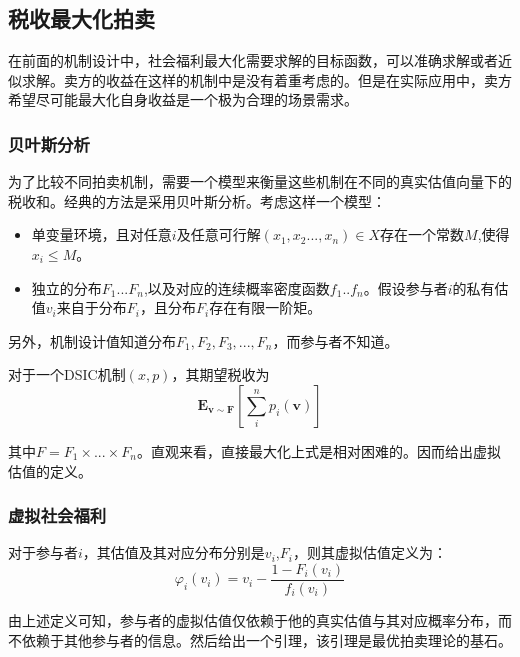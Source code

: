 \documentclass[promaster]{thesis-uestc}
\begin{document}
\subsection{税收最大化拍卖}
在前面的机制设计中，社会福利最大化需要求解的目标函数，可以准确求解或者近似求解。卖方的收益在这样的机制中是没有着重考虑的。但是在实际应用中，卖方希望尽可能最大化自身收益是一个极为合理的场景需求。

\subsubsection{贝叶斯分析}
为了比较不同拍卖机制，需要一个模型来衡量这些机制在不同的真实估值向量下的税收和。经典的方法是采用贝叶斯分析。考虑这样一个模型：

\begin{itemize}
    \item 单变量环境，且对任意$i$及任意可行解$(x_1,x_2...,x_n)\in X$存在一个常数$M$,使得$x_i\leq M$。
    \item 独立的分布$F_1...F_n$,以及对应的连续概率密度函数$f_1..f_n$。假设参与者$i$的私有估值$v_i$来自于分布$F_i$，且分布$F_i$存在有限一阶矩。
\end{itemize}

另外，机制设计值知道分布$F_1,F_2,F_3,...,F_n$，而参与者不知道。

\begin{definition}[期望税收]
对于一个DSIC机制$(x,p)$，其期望税收为
   \begin{equation}
    \mathbf{E}_{\mathbf{v}\sim\mathbf{F}}{\left[\sum_{i}^{n}{p_i(\mathbf{v})}\right]}
    \end{equation}
\end{definition}

其中$F=F_1\times...\times F_n$。直观来看，直接最大化上式是相对困难的。因而给出虚拟估值的定义。

\subsubsection{虚拟社会福利}

\begin{definition}[虚拟估值]
    对于参与者$i$，其估值及其对应分布分别是$v_i$,$F_i$，则其虚拟估值定义为：
    \begin{equation}
     \varphi_i(v_i) = v_i - \frac{1-F_i(v_i)}{f_i(v_i)}   
    \end{equation}
\end{definition}

由上述定义可知，参与者的虚拟估值仅依赖于他的真实估值与其对应概率分布，而不依赖于其他参与者的信息。然后给出一个引理，该引理是最优拍卖理论的基石。
\end{document}
